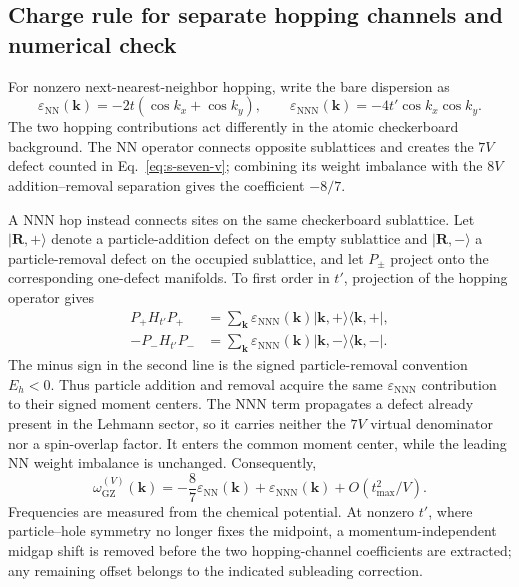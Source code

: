 \documentclass[10pt]{article}
\newcommand{\tp}{t'}
\newcommand{\wzero}{\omega_{\mathrm{GZ}}}
\begin{document}
\subsection{Charge rule for separate hopping channels and numerical check}
\label{sec:s-charge-bond-rule}
For nonzero next-nearest-neighbor hopping, write the bare dispersion as
\begin{equation}
 \varepsilon_{\mathrm{NN}}(\mathbf k)=-2t(\cos k_x+\cos k_y),\qquad
 \varepsilon_{\mathrm{NNN}}(\mathbf k)=-4\tp\cos k_x\cos k_y.
 \label{eq:s-charge-components}
\end{equation}
The two hopping contributions act differently in the atomic checkerboard background. The NN operator connects opposite sublattices and creates the $7V$ defect counted in Eq.~\ref{eq:s-seven-v}; combining its weight imbalance with the $8V$ addition--removal separation gives the coefficient $-8/7$.

A NNN hop instead connects sites on the same checkerboard sublattice. Let $|\mathbf R,+\rangle$ denote a particle-addition defect on the empty sublattice and $|\mathbf R,-\rangle$ a particle-removal defect on the occupied sublattice, and let $P_\pm$ project onto the corresponding one-defect manifolds. To first order in $\tp$, projection of the hopping operator gives
\begin{equation}
\begin{aligned}
 P_+H_{\tp}P_+
 &=\sum_{\mathbf k}\varepsilon_{\mathrm{NNN}}(\mathbf k)
 |\mathbf k,+\rangle\langle\mathbf k,+|,\\
 -P_-H_{\tp}P_-
 &=\sum_{\mathbf k}\varepsilon_{\mathrm{NNN}}(\mathbf k)
 |\mathbf k,-\rangle\langle\mathbf k,-|.
\end{aligned}
\label{eq:s-projected-nnn-defect}
\end{equation}
The minus sign in the second line is the signed particle-removal convention $E_h<0$. Thus particle addition and removal acquire the same $\varepsilon_{\mathrm{NNN}}$ contribution to their signed moment centers. The NNN term propagates a defect already present in the Lehmann sector, so it carries neither the $7V$ virtual denominator nor a spin-overlap factor. It enters the common moment center, while the leading NN weight imbalance is unchanged. Consequently,
\begin{equation}
 \boxed{\wzero^{(V)}(\mathbf k)=-\frac87\varepsilon_{\mathrm{NN}}(\mathbf k)
 +\varepsilon_{\mathrm{NNN}}(\mathbf k)+O(t_{\max}^2/V).}
 \label{eq:s-hopping-channel-charge}
\end{equation}
Frequencies are measured from the chemical potential. At nonzero $\tp$, where particle--hole symmetry no longer fixes the midpoint, a momentum-independent midgap shift is removed before the two hopping-channel coefficients are extracted; any remaining offset belongs to the indicated subleading correction.
\end{document}
